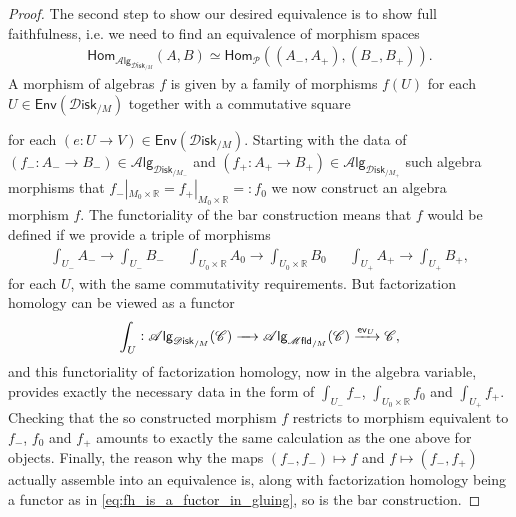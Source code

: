 \documentclass[12pt,a4paper]{article}
\theoremstyle{definition}
\theoremstyle{plain}
\theoremstyle{remark}
\newcommand{\catC}{\mathscr{C}}
\newcommand{\mfld}[1][s]{%
    \ifx r#1\mathsf{Mfld}\else
    \ifx s#1\mathscr{M} \mathsf{fld}\else
    \mathrm{Illegal~option}%
    \fi\fi
}
\newcommand{\disk}{\mathscr{D} \mathsf{isk}}
\newcommand{\alg}[1]{\mathscr{A} \mathsf{lg}_{#1}}
\begin{document}
\begin{proof}
    The second step to show our desired equivalence is to show full faithfulness, i.e. we need to find an equivalence of morphism spaces
    \begin{align}
        \mathsf{Hom}_{\alg{\disk_{/M}}}(A, B) \simeq \mathsf{Hom}_{\mathscr{P}}((A_-, A_+), (B_-, B_+)).
    \end{align}
    A morphism of algebras $f$ is given by a family of morphisms $f(U)$ for each $U \in \mathsf{Env}(\disk_{/M})$ together with a commutative square
    \begin{center}
    \end{center}
    for each $(e: U \rightarrow V) \in \mathsf{Env}(\disk_{/M})$. Starting with the data of $(f_-:A_- \rightarrow B_-) \in \alg{\disk_{/M_-}}$ and $(f_+:A_+ \rightarrow B_+) \in \alg{\disk_{/M_+}}$ such algebra morphisms that $f_-|_{M_0 \times \mathbb{R}} = f_+|_{M_0 \times \mathbb{R}} =: f_0$ we now construct an algebra morphism $f$. The functoriality of the bar construction means that $f$ would be defined if we provide a triple of morphisms
    \begin{align}
        &\int_{U_-} A_- \rightarrow \int_{U_-} B_-& &\int_{U_0 \times \mathbb{R}} A_0 \rightarrow \int_{U_0 \times \mathbb{R}} B_0& &\int_{U_+} A_+ \rightarrow \int_{U_+} B_+,&
    \end{align}
    for each $U$, with the same commutativity requirements. But factorization homology can be viewed as a functor
    \begin{align}\label{eq:fh_is_a_fuctor_in_gluing}
        \int_U : \alg{\disk_{/M}} (\catC) \xrightarrow{\quad} \alg{\mfld_{/M}} (\catC) \xrightarrow{\mathsf{ev}_{U}} \catC,
    \end{align}
    and this functoriality of factorization homology, now in the algebra variable, provides exactly the necessary data in the form of $\int_{U_-} f_-$, $\int_{U_0 \times \mathbb{R}} f_0$ and $\int_{U_+} f_+$. Checking that the so constructed morphism $f$ restricts to morphism equivalent to $f_-$, $f_0$ and $f_+$ amounts to exactly the same calculation as the one above for objects. Finally, the reason why the maps $(f_-, f_-) \mapsto f$ and $f \mapsto (f_-, f_+)$ actually assemble into an equivalence is, along with factorization homology being a functor as in \cref{eq:fh_is_a_fuctor_in_gluing}, so is the bar construction.
\end{proof}
\end{document}
